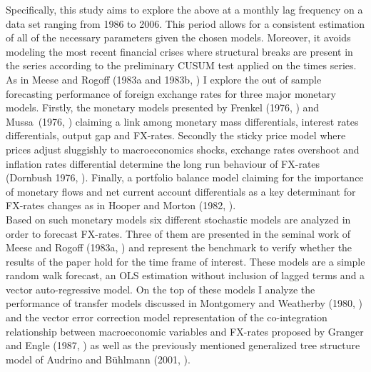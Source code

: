 Specifically, this study aims to explore the above at a monthly lag
frequency on a data set ranging from 1986 to 2006. This period allows
for a consistent estimation of all of the necessary parameters given
the chosen models. Moreover, it avoids modeling the most recent
financial crises where structural breaks are present in the series
according to the preliminary CUSUM test applied on the times series.\\
As in Meese and Rogoff (1983a and 1983b,
\cite{MeeseRogoffa,MeeseRogoffb}) I explore the out of sample
forecasting performance of foreign exchange rates for three major
monetary models. Firstly, the monetary models presented by Frenkel
(1976, \cite{Frenkel1976}) and Mussa\ (1976, \cite{Mussa1976})
claiming a link among monetary mass differentials, interest rates
differentials, output gap and FX-rates. Secondly the sticky price
model where prices adjust sluggishly to macroeconomics shocks,
exchange rates overshoot and inflation rates differential determine
the long run behaviour of FX-rates (Dornbush 1976,
\cite{Dornbusch}). Finally, a portfolio balance model claiming for the
importance of monetary flows and net current account differentials as
a key determinant for FX-rates changes as in Hooper and Morton (1982,
\cite{HooperMorton1982}).\\
Based on such monetary models six different stochastic models are
analyzed in order to forecast FX-rates. Three of them are presented in
the seminal work of Meese and Rogoff (1983a, \cite{MeeseRogoffa}) and
represent the benchmark to verify whether the results of the paper
hold for the time frame of interest. These models are a simple random
walk forecast, an OLS estimation without inclusion of lagged terms and
a vector auto-regressive model. On the top of these models I analyze
the performance of transfer models discussed in Montgomery and
Weatherby (1980, \cite{MontgomeryWeatherby}) and the vector error
correction model representation of the co-integration relationship
between macroeconomic variables and FX-rates proposed by Granger and
Engle (1987, \cite{EngleGranger}) as well as the previously mentioned
generalized tree structure model of Audrino and B{\"u}hlmann (2001,
\cite{AudrinoBuhlmann}).

